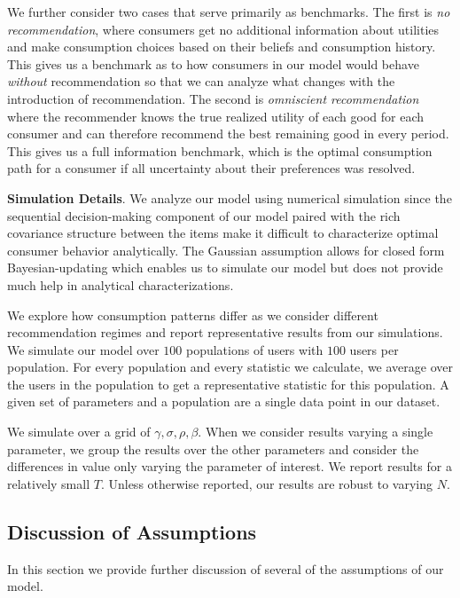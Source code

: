\documentclass[sigconf]{acmart}
\begin{document}
We further consider two cases that serve primarily as benchmarks. The first is \textit{no recommendation}, where consumers get no additional information about utilities and make consumption choices based on their beliefs and consumption history. This gives us a benchmark as to how consumers in our model would behave \textit{without} recommendation so that we can analyze what changes with the introduction of recommendation. The second is \textit{omniscient recommendation} where the recommender knows the true realized utility of each good for each consumer and can therefore recommend the best remaining good in every period. This gives us a full information benchmark, which is the optimal consumption path for a consumer if all uncertainty about their preferences was resolved.
\par
\noindent \textbf{Simulation Details}. We analyze our model using numerical simulation since the sequential decision-making component of our model paired with the rich covariance structure between the items make it difficult to characterize optimal consumer behavior analytically. The Gaussian assumption allows for closed form Bayesian-updating which enables us to simulate our model but does not provide much help in analytical characterizations.

We explore how consumption patterns differ as we consider different recommendation regimes and report representative results from our simulations. We simulate our model over $100$ populations of users with $100$ users per population. For every population and every statistic we calculate, we average over the users in the population to get a representative statistic for this population. A given set of parameters and a population are a single data point in our dataset.

We simulate over a grid of $\gamma, \sigma, \rho, \beta$. When we consider results varying a single parameter, we group the results over the other parameters and consider the differences in value only varying the parameter of interest. We report results for a relatively small $T$. Unless otherwise reported, our results are robust to varying $N$.

\subsection{Discussion of Assumptions}

In this section we provide further discussion of several of the assumptions of our model.
\end{document}
